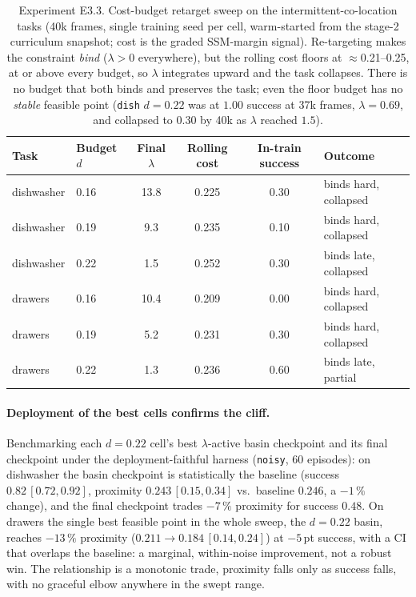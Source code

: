 \documentclass[11pt,a4paper]{report}
\newcommand{\ssm}{SSM}
\begin{document}
\begin{table}[htbp]
\centering
\small
\caption{Experiment E3.3. Cost-budget retarget sweep on the
intermittent-co-location tasks (40k frames, single training seed per
cell, warm-started from the stage-2 curriculum snapshot; cost is the
graded \ssm{}-margin signal). Re-targeting makes the constraint
\emph{bind} ($\lambda > 0$ everywhere), but the rolling cost floors
at $\approx$0.21--0.25, at or above every budget, so $\lambda$
integrates upward and the task collapses. There is no budget that
both binds and preserves the task; even the floor budget has no
\emph{stable} feasible point (\texttt{dish} $d{=}0.22$ was at $1.00$
success at 37k frames, $\lambda = 0.69$, and collapsed to $0.30$ by
40k as $\lambda$ reached $1.5$).}
\label{tab:e3.3-budget-sweep}
\begin{tabular}{llcccl}
\toprule
Task & Budget $d$ & Final $\lambda$ & Rolling cost & In-train success & Outcome \\
\midrule
dishwasher & 0.16 & 13.8 & 0.225 & 0.30 & binds hard, collapsed \\
dishwasher & 0.19 & 9.3  & 0.235 & 0.10 & binds hard, collapsed \\
dishwasher & 0.22 & 1.5  & 0.252 & 0.30 & binds late, collapsed \\
drawers    & 0.16 & 10.4 & 0.209 & 0.00 & binds hard, collapsed \\
drawers    & 0.19 & 5.2  & 0.231 & 0.30 & binds hard, collapsed \\
drawers    & 0.22 & 1.3  & 0.236 & 0.60 & binds late, partial \\
\bottomrule
\end{tabular}
\end{table}

\paragraph{Deployment of the best cells confirms the cliff.}
Benchmarking each $d = 0.22$ cell's best $\lambda$-active basin
checkpoint and its final checkpoint under the deployment-faithful
harness (\texttt{noisy}, 60 episodes): on dishwasher the basin
checkpoint is statistically the baseline (success $0.82\,[0.72,
0.92]$, proximity $0.243\,[0.15, 0.34]$ vs.\ baseline $0.246$, a
$-1\,\%$ change), and the final checkpoint trades $-7\,\%$ proximity
for success $0.48$. On drawers the single best feasible point in the
whole sweep, the $d = 0.22$ basin, reaches $-13\,\%$ proximity
($0.211 \to 0.184\,[0.14, 0.24]$) at $-5$\,pt success, with a CI that
overlaps the baseline: a marginal, within-noise improvement, not a
robust win. The relationship is a monotonic trade, proximity falls
only as success falls, with no graceful elbow anywhere in the swept
range.
\end{document}
